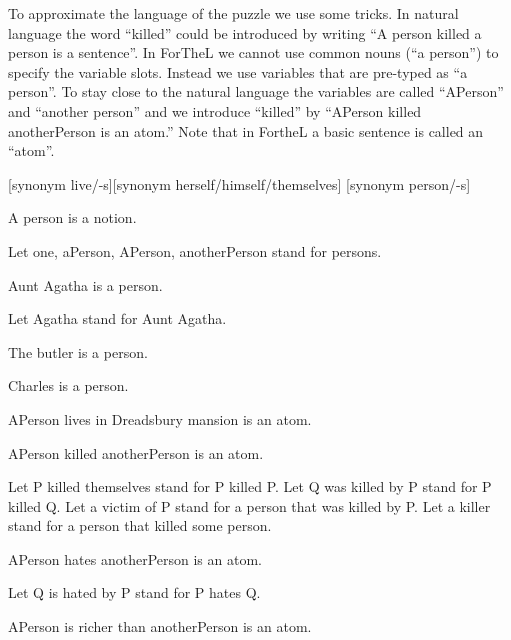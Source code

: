 \documentclass{article}
\begin{document}
To approximate the language of the puzzle we use some tricks.
In natural language the word ``killed'' could be introduced by writing
``A person killed a person is a sentence''. In ForTheL we cannot use
common nouns (``a person'') to specify the variable slots. Instead
we use variables that are pre-typed as ``a person''. To stay close
to the natural language the variables are called ``APerson'' and
``another person'' and we introduce ``killed'' by 
``APerson killed anotherPerson is an atom.''
Note that in FortheL a basic sentence is called an ``atom''. \\

\begin{forthel}

[synonym live/-s][synonym herself/himself/themselves]
[synonym person/-s]

\begin{signature}
A person is a notion.
\end{signature}
Let one, aPerson, APerson, anotherPerson  stand for persons.
\begin{signature}
Aunt Agatha is a person.
\end{signature}
Let Agatha stand for Aunt Agatha.
\begin{signature}
The butler is a person.
\end{signature}
\begin{signature}
Charles is a person.
\end{signature}

\begin{signature}
APerson lives in Dreadsbury mansion is an atom.
\end{signature}

\begin{signature}
APerson killed anotherPerson is an atom.
\end{signature}
Let P killed themselves stand for P killed P.
Let Q was killed by P stand for P killed Q.
Let a victim of P stand for a person that was killed by P.
Let a killer stand for a person that killed some person.

\begin{signature}
APerson hates anotherPerson is an atom.
\end{signature}
Let Q is hated by P stand for P hates Q.

\begin{signature}
APerson is richer than anotherPerson is an atom.
\end{signature}

\end{forthel}
\end{document}
